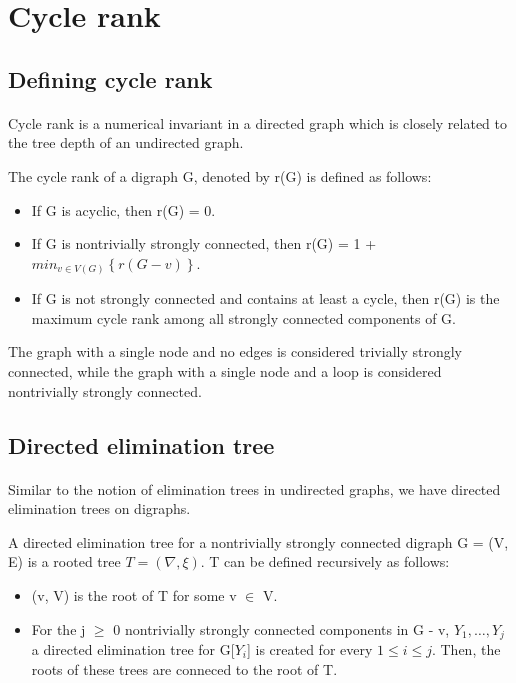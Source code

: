 \section{Cycle rank}

\subsection{Defining cycle rank}

\paragraph{}
Cycle rank is a numerical invariant in a directed graph which is closely related to the tree depth of an undirected graph.
\begin{definition}
The cycle rank of a digraph G, denoted by r(G) is defined as follows:

\begin{itemize}
\item If G is acyclic, then r(G) = 0.
\item If G is nontrivially strongly connected, then r(G) = 1 + $min_{v \in V(G)} \left\{r(G-v)\right\}$.
\item If G is not strongly connected and contains at least a cycle, then r(G) is the maximum cycle rank among all strongly connected components of G.
\end{itemize}

The graph with a single node and no edges is considered trivially strongly connected, while the graph with a single node and a loop is considered nontrivially strongly connected.

\end{definition}

\subsection{Directed elimination tree}

\paragraph{}
Similar to the notion of elimination trees in undirected graphs, we have directed elimination trees on digraphs.

\begin{definition}

A directed elimination tree for a nontrivially strongly connected digraph G = (V, E) is a rooted tree $T = (\nabla, \xi)$. T can be defined recursively as follows:

\begin{itemize}
\item (v, V) is the root of T for some v $\in$ V.
\item For the j $\geq$ 0 nontrivially strongly connected components in G - v, $Y_1, \ldots, Y_j$ a directed elimination tree for G[$Y_i$] is created for every $1 \leq i \leq j$. Then, the roots of these trees are conneced to the root of T.
\end{itemize}
\label{definition:DET}
\end{definition}


